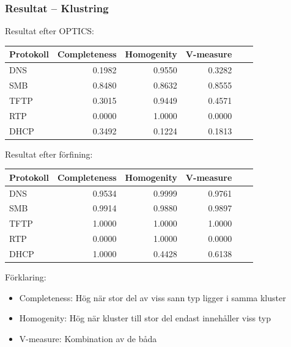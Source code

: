 \documentclass[xetex, 8pt]{beamer}
\begin{document}
    \begin{frame}
        \frametitle{Resultat -- Klustring}
        Resultat efter OPTICS:
        \begin{table}[h]
            \centering
            \scriptsize{
                \begin{tabular}{| l | r | r | r | r | r |}
                    \hline
                    \textbf{Protokoll}&\textbf{Completeness}&\textbf{Homogenity}&\textbf{V-measure} \\ \hline
                    DNS & 0.1982 & 0.9550 & 0.3282 \\ \hline
                    SMB & 0.8480 & 0.8632 & 0.8555 \\ \hline
                    TFTP & 0.3015 & 0.9449 & 0.4571 \\ \hline
                    RTP & 0.0000 & 1.0000 & 0.0000 \\ \hline
                    DHCP & 0.3492 & 0.1224 & 0.1813 \\ \hline
                \end{tabular}
            }
        \end{table}
        Resultat efter förfining:
        \begin{table}[h]
            \centering
            \scriptsize{
                \begin{tabular}{| l | r | r | r | r | r |}
                    \hline
                    \textbf{Protokoll}&\textbf{Completeness}&\textbf{Homogenity}&\textbf{V-measure} \\ \hline
                    DNS & 0.9534 & 0.9999 & 0.9761 \\ \hline
                    SMB & 0.9914 & 0.9880 & 0.9897 \\ \hline
                    TFTP & 1.0000 & 1.0000 & 1.0000 \\ \hline
                    RTP & 0.0000 & 1.0000 & 0.0000 \\ \hline
                    DHCP & 1.0000 & 0.4428 & 0.6138 \\ \hline
                \end{tabular}
            }
        \end{table}
        Förklaring:
        \begin{itemize}
            \item Completeness: Hög när stor del av viss sann typ ligger i
                samma kluster
            \item Homogenity: Hög när kluster till stor del endast innehåller
                viss typ
            \item V-measure: Kombination av de båda
        \end{itemize}
    \end{frame}
\end{document}
